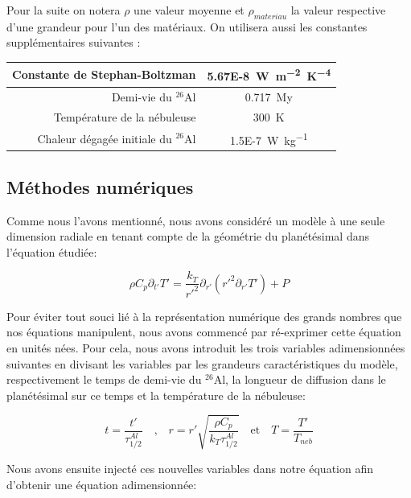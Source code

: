 \documentclass[10pt,a4paper]{article}
\numberwithin{equation}{section}
\begin{document}
Pour la suite on notera $\rho$ une valeur moyenne et $\rho_{materiau}$ la valeur respective d'une grandeur pour l'un des matériaux.
On utilisera aussi les constantes supplémentaires suivantes :

\begin{center}
  \begin{tabu}{ r  c }
    \hline
    Constante de Stephan-Boltzman & \SI{5.67E-8}{W.m^{-2}.K^{-4}}  \\ \hline
    Demi-vie du $^{26}$Al & \SI{0.717}{My}  \\ \hline
    Température de la nébuleuse & \SI{300}{K}  \\ \hline
    Chaleur dégagée initiale du $^{26}$Al & \SI{1.5E-7}{W.kg^{-1}}  \\ \hline
  \end{tabu}
\end{center}


\subsection{Méthodes numériques}

Comme nous l'avons mentionné, nous avons considéré un modèle à une seule dimension radiale en tenant compte de la géométrie du planétésimal dans l'équation étudiée:

\begin{equation}
\rho C_p \partial_{t'} T' = \frac{k_{T} }{r'^2} \partial_{r'} ( {r'}^2 \partial_{r'} T')  + P
\end{equation}



Pour éviter tout souci lié à la représentation numérique des grands nombres que nos équations manipulent, nous avons commencé par ré-exprimer cette équation en unités nées. Pour cela, nous avons introduit les trois variables adimensionnées suivantes en divisant les variables par les grandeurs caractéristiques du modèle, respectivement le temps de demi-vie du $^{26}$Al, la longueur de diffusion dans le planétésimal sur ce temps et la température de la nébuleuse: 


\begin{equation}
t= \frac{t'}{\tau^{Al}_{1/2}}  \quad \textrm{,} \quad   r = r' \sqrt{\frac{\rho C_p} {k_T \tau^{Al}_{1/2}}} \quad  \textrm{et} \quad T = \frac{T'}{T_{neb}} 
\end{equation}

Nous avons ensuite injecté ces nouvelles variables dans notre équation afin d'obtenir une équation adimensionnée:
\end{document}
